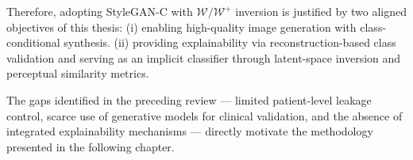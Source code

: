Therefore, adopting StyleGAN-C with $\mathcal{W}/\mathcal{W}^+$ inversion is justified by two aligned objectives of this thesis: 
(i)  enabling high-quality image generation with class-conditional synthesis.
(ii) providing explainability via reconstruction-based class validation and serving as an implicit classifier through latent-space inversion and perceptual similarity metrics.

The gaps identified in the preceding review --- limited patient-level leakage control, scarce use of generative models for clinical validation, and the absence of integrated explainability mechanisms --- directly motivate the methodology presented in the following chapter.
